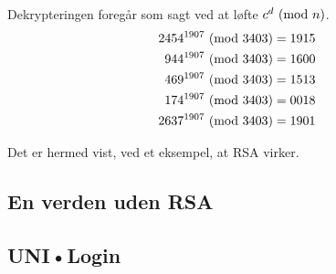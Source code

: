 Dekrypteringen foregår som sagt ved at løfte \(c^d \ (\mathrm{mod}\ n)\).
\begin{align*}
    2454^{1907} \ (\mathrm{mod}\ 3403) &= 1915\\
    944^{1907} \ (\mathrm{mod}\ 3403)  &= 1600\\
    469^{1907} \ (\mathrm{mod}\ 3403)  &= 1513\\
    174^{1907} \ (\mathrm{mod}\ 3403)  &= 0018\\
    2637^{1907} \ (\mathrm{mod}\ 3403) &= 1901\\
\end{align*}

Det er hermed vist, ved et eksempel, at RSA virker.







\subsection{En verden uden RSA}



\subsection{UNI•Login}


